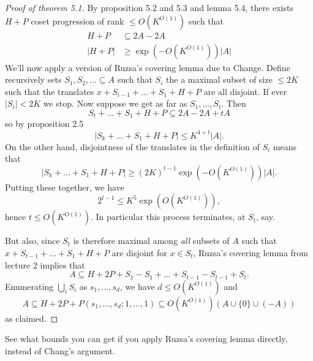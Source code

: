 \documentclass[a4paper]{article}
\begin{document}
\begin{proof}[Proof of theorem 5.1]
  By proposition 5.2 and 5.3 and lemma 5.4, there exists \(H + P\) coset progression of rank \(\leq O(K^{O(1)})\) such that
  \begin{align*}
    H + P &\subseteq 2A - 2A \\
    |H + P| &\geq \exp(-O(K^{O(1)})) |A|
  \end{align*}
  We'll now apply a version of Ruzsa's covering lemma due to Change. Define recursively sets \(S_1, S_2, \dots \subseteq A\) such that \(S_i\) the a maximal subset of size \(\leq 2K\) such that the translates \(x + S_{i - 1} + \dots + S_1 + H + P\) are all disjoint. If ever \(|S_i| < 2K\) we stop. Now suppose we get as far as \(S_1, \dots, S_t\). Then
  \[
    S_t + \dots + S_1 + H + P \subseteq 2A - 2A + tA
  \]
  so by proposition 2.5
  \[
    |S_k + \dots + S_1 + H + P| \leq K^{4 + t}|A|.
  \]
  On the other hand, disjointness of the translates in the definition of \(S_i\) means that
  \[
    |S_k + \dots + S_1 + H + P| \geq (2K)^{t - 1} \exp (-O(K^{O(1)})) |A|.
  \]
  Putting these together, we have
  \[
    2^{t - 1} \leq K^5 \exp (O(K^{O(1)})),
  \]
  hence \(t \leq O(K^{O(1)})\). In particular this process terminates, at \(S_t\), say.

  But also, since \(S_t\) is therefore maximal among \emph{all} subsets of \(A\) such that \(x + S_{t - 1} + \dots + S_1 + H + P\) are disjoint for \(x \in S_t\), Ruzsa's covering lemma from lecture 2 implies that
  \[
    A \subseteq H + 2P + S_1 - S_1 + \dots + S_{t - 1} - S_{t - 1} + S_t.
  \]
  Enumerating \(\bigcup_i S_i\) as \(s_1, \dots, s_d\), we have \(d \leq O(K^{O(1)})\) and
  \[
    A \subseteq H + 2P + P(s_1, \dots, s_d; 1, \dots, 1) \subseteq O(K^{O(1)}) (A \cup \{0\} \cup (-A))
  \]
  as claimed.
\end{proof}

\begin{ex}
  See what bounds you can get if you apply Ruzsa's covering lemma directly, instead of Chang's argument.
\end{ex}










\printindex
\end{document}
